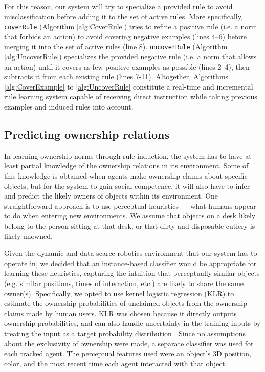\documentclass[letterpaper]{article} %
\begin{document}
For this reason, our system will try to specialize a provided rule to avoid misclassification before adding it to the set of active rules. More specifically, \texttt{\small{coverRule}} (Algorithm \ref{alg:CoverRule}) tries to refine a positive rule (i.e. a norm that forbids an action) to avoid covering negative examples (lines 4--6) before merging it into the set of active rules (line 8). \texttt{\small{uncoverRule}} (Algorithm \ref{alg:UncoverRule}) specializes the provided negative rule (i.e. a norm that allows an action) until it covers as few positive examples as possible (lines 2--4), then subtracts it from each existing rule (lines 7-11). Altogether, Algorithms \ref{alg:CoverExample} to \ref{alg:UncoverRule} constitute a real-time and incremental rule learning system capable of receiving direct instruction while taking previous examples and induced rules into account.


\subsection{Predicting ownership relations}

In learning ownership norms through rule induction, the system has to have at least partial knowledge of the ownership relations in its environment. Some of this knowledge is obtained when agents make ownership claims about specific objects, but for the system to gain social competence, it will also have to infer and predict the likely owners of objects within its environment. One straightforward approach is to use perceptual heuristics --- what humans appear to do when entering new environments. We assume that objects on a desk likely belong to the person sitting at that desk, or that dirty and disposable cutlery is likely unowned.

Given the dynamic and data-scarce robotics environment that our system has to operate in, we decided that an instance-based classifier would be appropriate for learning these heuristics, capturing the intuition that perceptually similar objects (e.g. similar positions, times of interaction, etc.) are likely to share the same owner(s). Specifically, we opted to use kernel logistic regression (KLR) \cite{zhu2005kernel} to estimate the ownership probabilities of unclaimed objects from the ownership claims made by human users. KLR was chosen because it directly outputs ownership probabilities, and can also handle uncertainty in the training inputs by treating the input as a target probability distribution \cite{magder1997logistic}. Since no assumptions about the exclusivity of ownership were made, a separate classifier was used for each tracked agent. The perceptual features used were an object's 3D position, color, and the most recent time each agent interacted with that object.
\end{document}
